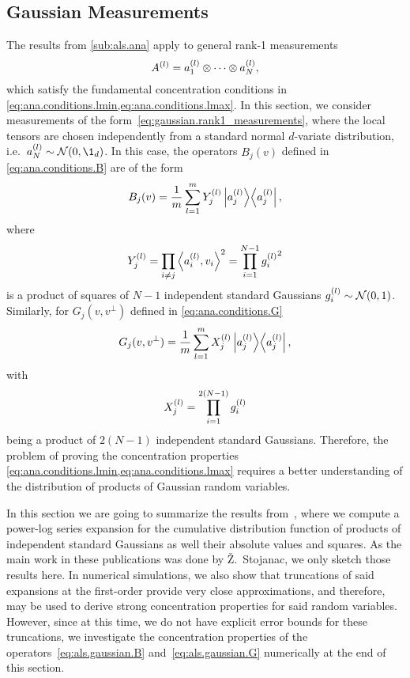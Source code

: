 \subsection{Gaussian Measurements}%
\label{sub:als.gaussian_measurements}

The results from \cref{sub:als.ana} apply to general rank-1 measurements
\[
  A^{(l)} = a^{(l)}_1 \otimes \cdots \otimes a^{(l)}_N,
  \label{eq:gaussian.rank1_measurements}
\]
which satisfy the fundamental concentration conditions in \cref{eq:ana.conditions.lmin,eq:ana.conditions.lmax}.
In this section, we consider measurements of the form~\eqref{eq:gaussian.rank1_measurements}, where the local tensors are chosen independently from a standard normal $d$-variate distribution, i.e.\ $a\ind{l}_N \sim \Normal(0, \1_d)$.
In this case, the operators $B_j(v)$ defined in \cref{eq:ana.conditions.B} are of the form
\[
  \label{eq:als.gaussian.B}
  B_j(v) = \frac{1}{m} \sum_{l=1}^m Y_j^{(l)} \left| a^{(l)}_j \middle\rangle\middle\langle a^{(l)}_j \right|,
\]
where
\[
  Y_j^{(l)} = \prod_{i \neq j} \Braket{a_i^{(l)}, v_i}^2 = \prod_{i = 1}^{N - 1} {g^{(l)}_i}^2
\]
is a product of squares of $N - 1$ independent standard Gaussians $g^{(l)}_i \sim \mathcal{N}(0, 1)$.
Similarly, for $G_j(v, v^\perp)$ defined in \cref{eq:ana.conditions.G}
\[
  \label{eq:als.gaussian.G}
  G_j(v, v^\perp) = \frac{1}{m} \sum_{l=1}^m X_j^{(l)} \left| a^{(l)}_j \middle\rangle\middle\langle a^{(l)}_j \right|,
\]
with
\[
  X_j^{(l)} = \prod_{i = 1}^{2(N - 1)} {g^{(l)}_i}
\]
being a product of $2(N - 1)$ independent standard Gaussians.
Therefore, the problem of proving the concentration properties \cref{eq:ana.conditions.lmin,eq:ana.conditions.lmax} requires a better understanding of the distribution of products of Gaussian random variables.

In this section we are going to summarize the results from~\cite{Stojanac,Stojanac}, where we compute a power-log series expansion for the cumulative distribution function of products of independent standard Gaussians as well their absolute values and squares.
As the main work in these publications was done by Ž.\ Stojanac, we only sketch those results here.
In numerical simulations, we also show that truncations of said expansions at the first-order provide very close approximations, and therefore, may be used to derive strong concentration properties for said random variables.
However, since at this time, we do not have explicit error bounds for these truncations, we investigate the concentration properties of the operators~\eqref{eq:als.gaussian.B} and~\eqref{eq:als.gaussian.G} numerically at the end of this section.\\



